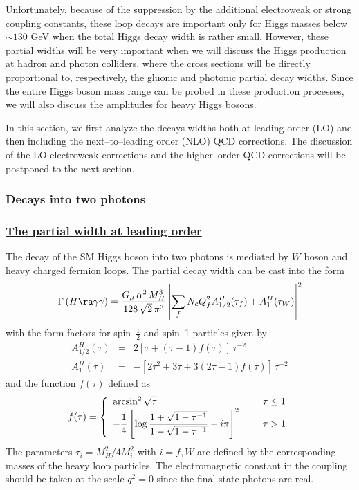 Unfortunately, because of the suppression by the additional electroweak or
strong coupling constants, these loop decays are  important only for Higgs
masses below $\sim 130$ GeV when the total Higgs decay  width is rather small. 
However, these partial widths will be very important when we will discuss the
Higgs production at hadron and photon colliders, where the cross sections will
be directly proportional to, respectively, the gluonic and photonic partial 
decay widths. Since the entire Higgs boson mass range can be probed in these 
production processes, we will also discuss the amplitudes for heavy Higgs 
bosons.\s

In this section, we first analyze the decays widths both at leading order (LO) 
and then including the next--to--leading order (NLO) QCD corrections. The 
discussion of the LO electroweak corrections and the higher--order QCD 
corrections will be postponed to the next section. 
 
\subsubsection{Decays into two photons}

\subsubsection*{\underline{The partial width at leading order}}

The decay of the SM Higgs boson into two photons is mediated by $W$ boson and 
heavy  charged fermion loops. The partial decay width  can be cast into the 
form \cite{EGN,HppBorn,HppBorn0,HppAnnecy}
\begin{eqnarray}
\Gamma\, (H\ra \gamma\gamma) = \frac{G_{\mu}\, \alpha^{2}\,M_{H}^{3}}
{128\,\sqrt{2}\,\pi^{3}} \left| \sum_{f} N_{c} Q_f^2 A_{1/2}^H(\tau_f) +
A^H_1(\tau_W) \right|^2
\label{eq:hgaga}
\end{eqnarray}
with the form factors for spin--$\frac{1}{2}$ and spin--1 particles given by
\begin{eqnarray}
A_{1/2}^H(\tau) & = & 2 [\tau +(\tau -1)f(\tau)]\, \tau^{-2}  \nonumber \\   
A_1^H(\tau) & = & - [2\tau^2 +3\tau+3(2\tau -1)f(\tau)]\, \tau^{-2}
\label{eq:Af+Aw}
\end{eqnarray}
and the function $f(\tau)$ defined as
\begin{eqnarray}
f(\tau)=\left\{
\begin{array}{ll}  \displaystyle
\arcsin^2\sqrt{\tau} & \tau\leq 1 \\
\displaystyle -\frac{1}{4}\left[ \log\frac{1+\sqrt{1-\tau^{-1}}}
{1-\sqrt{1-\tau^{-1}}}-i\pi \right]^2 \hspace{0.5cm} & \tau>1
\end{array} \right.
\label{eq:ftau}
\end{eqnarray}
The parameters $\tau_i= M_H^2/4M_i^2$ with $i=f,W$ are defined by the
corresponding masses of the heavy loop particles. The electromagnetic 
constant in the coupling should be taken at the scale $q^2=0$ since the 
final state photons are real. \s

